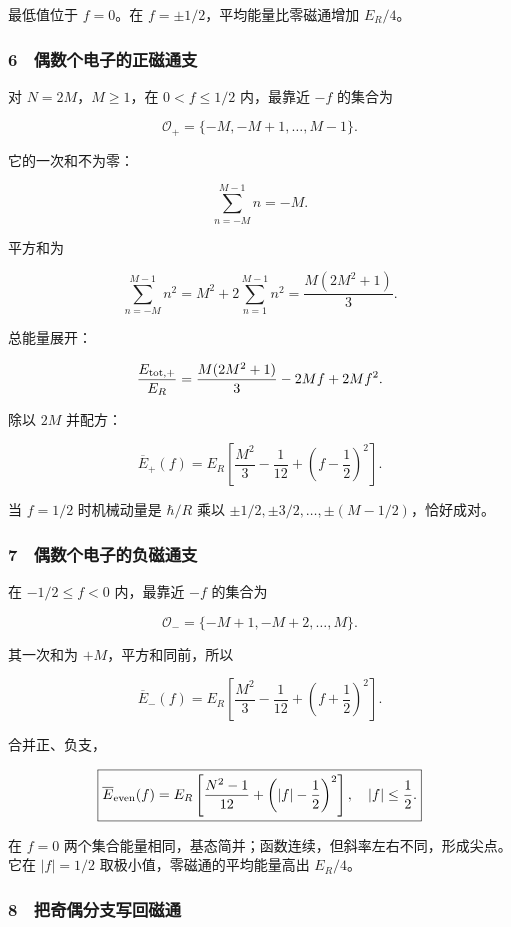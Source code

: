 \documentclass[12pt,a4paper,fontset=fandol]{ctexart}
\begin{document}
最低值位于 \(f=0\)。在 \(f=\pm1/2\)，平均能量比零磁通增加 \(E_R/4\)。

\subsubsection{6　偶数个电子的正磁通支}\label{ux5076ux6570ux4e2aux7535ux5b50ux7684ux6b63ux78c1ux901aux652f}

对 \(N=2M\)，\(M\ge1\)，在 \(0<f\le1/2\) 内，最靠近 \(-f\) 的集合为

\[\mathcal O_+=\{-M,-M+1,\ldots,M-1\}.\]

它的一次和不为零：

\[\sum_{n=-M}^{M-1}n=-M.\]

平方和为

\[\sum_{n=-M}^{M-1}n^2
=M^2+2\sum_{n=1}^{M-1}n^2
=\frac{M(2M^2+1)}3.\]

总能量展开：

\[\frac{E_{\rm tot,+}}{E_R}
=\frac{M(2M^2+1)}3-2Mf+2Mf^2.\]

除以 \(2M\) 并配方：

\[\boxed{\overline E_+(f)
=E_R\left[\frac{M^2}{3}-\frac1{12}
+\left(f-\frac12\right)^2\right].}\]

当 \(f=1/2\) 时机械动量是 \(\hbar/R\) 乘以
\(\pm1/2,\pm3/2,\ldots,\pm(M-1/2)\)，恰好成对。

\subsubsection{7　偶数个电子的负磁通支}\label{ux5076ux6570ux4e2aux7535ux5b50ux7684ux8d1fux78c1ux901aux652f}

在 \(-1/2\le f<0\) 内，最靠近 \(-f\) 的集合为

\[\mathcal O_-= \{-M+1,-M+2,\ldots,M\}.\]

其一次和为 \(+M\)，平方和同前，所以

\[\boxed{\overline E_-(f)
=E_R\left[\frac{M^2}{3}-\frac1{12}
+\left(f+\frac12\right)^2\right].}\]

合并正、负支，

\[\boxed{\overline E_{\rm even}(f)
=E_R\left[\frac{N^2-1}{12}
+\left(|f|-\frac12\right)^2\right],
\quad |f|\le\frac12.}\]

在 \(f=0\)
两个集合能量相同，基态简并；函数连续，但斜率左右不同，形成尖点。它在
\(|f|=1/2\) 取极小值，零磁通的平均能量高出 \(E_R/4\)。

\subsubsection{8　把奇偶分支写回磁通}\label{ux628aux5947ux5076ux5206ux652fux5199ux56deux78c1ux901a}
\end{document}
